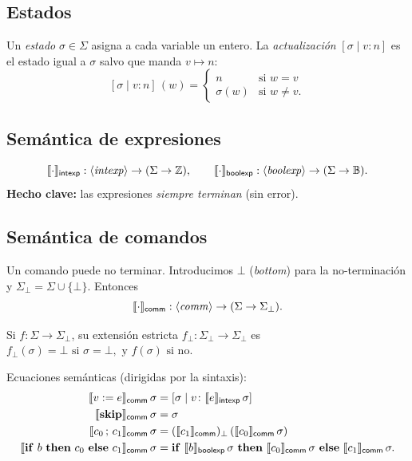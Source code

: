 \subsection*{Estados}
\begin{definition}
Un \emph{estado} $\sigma \in \Sigma$ asigna a cada variable un entero.
La \emph{actualización} $[\sigma \mid v\colon n]$ es el estado igual a $\sigma$
salvo que manda $v \mapsto n$:
\[
[\sigma \mid v\colon n]\,(w) =
\begin{cases} n & \text{si } w = v \\ \sigma(w) & \text{si } w \neq v. \end{cases}
\]
\end{definition}

\subsection*{Semántica de expresiones}
\[
\llbracket \cdot \rrbracket_{\mathsf{intexp}} : \langle\mathit{intexp}\rangle \to (\Sigma \to \mathbb{Z}),
\qquad
\llbracket \cdot \rrbracket_{\mathsf{boolexp}} : \langle\mathit{boolexp}\rangle \to (\Sigma \to \mathbb{B}).
\]
\textbf{Hecho clave:} las expresiones \emph{siempre terminan} (sin error).

\subsection*{Semántica de comandos}
Un comando puede no terminar. Introducimos $\bot$ (\emph{bottom}) para la
no-terminación y $\Sigma_\bot = \Sigma \cup \{\bot\}$. Entonces
\[
\llbracket \cdot \rrbracket_{\mathsf{comm}} : \langle\mathit{comm}\rangle \to (\Sigma \to \Sigma_\bot).
\]
\begin{definition}
Si $f : \Sigma \to \Sigma_\bot$, su extensión estricta $f_\bot : \Sigma_\bot \to \Sigma_\bot$ es
\(
f_\bot(\sigma) = \bot \text{ si } \sigma = \bot, \text{ y } f(\sigma) \text{ si no.}
\)
\end{definition}
Ecuaciones semánticas (dirigidas por la sintaxis):
\begin{align*}
\semc{v := e}\,\sigma &= [\sigma \mid v\colon \semi{e}\,\sigma] \\
\semc{\mathbf{skip}}\,\sigma &= \sigma \\
\semc{c_0\,;\,c_1}\,\sigma &= (\semc{c_1})_\bot\,(\semc{c_0}\,\sigma) \\
\semc{\mathbf{if}\ b\ \mathbf{then}\ c_0\ \mathbf{else}\ c_1}\,\sigma
   &= \mathbf{if}\ \semb{b}\,\sigma\ \mathbf{then}\ \semc{c_0}\,\sigma\ \mathbf{else}\ \semc{c_1}\,\sigma.
\end{align*}

